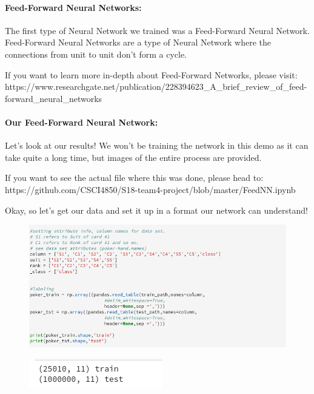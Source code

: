 \documentclass[11pt]{article}
\makeatletter
\def\maxwidth{\ifdim\Gin@nat@width>\linewidth\linewidth
    \else\Gin@nat@width\fi}
\let\Oldincludegraphics\includegraphics
\renewcommand{\includegraphics}[1]{\Oldincludegraphics[width=.8\maxwidth]{#1}}
\makeatother
\begin{document}
    \paragraph{Feed-Forward Neural
Networks:}\label{feed-forward-neural-networks}

    The first type of Neural Network we trained was a Feed-Forward Neural
Network. Feed-Forward Neural Networks are a type of Neural Network where
the connections from unit to unit don't form a cycle.

If you want to learn more in-depth about Feed-Forward Networks, please
visit:
https://www.researchgate.net/publication/228394623\_A\_brief\_review\_of\_feed-forward\_neural\_networks

    \paragraph{Our Feed-Forward Neural
Network:}\label{our-feed-forward-neural-network}

    Let's look at our results! We won't be training the network in this demo
as it can take quite a long time, but images of the entire process are
provided.

    If you want to see the actual file where this was done, please head to:
https://github.com/CSCI4850/S18-team4-project/blob/master/FeedNN.ipynb

    Okay, so let's get our data and set it up in a format our network can
understand!

    \begin{figure}[htbp]
\centering
\includegraphics{setup_data_FFNN.png}
\caption{}
\end{figure}

    \begin{figure}[htbp]
\centering
\includegraphics{setup_data_FFNN_part2.png}
\caption{}
\end{figure}
\end{document}
